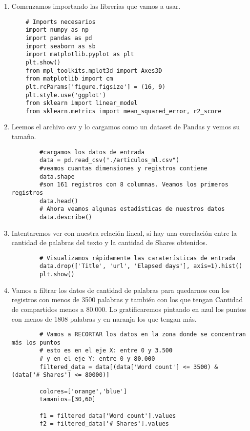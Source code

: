 \documentclass{article}
\begin{document}
\begin{enumerate}
    \item Comenzamos importando las librerías que vamos a usar.
    \begin{verbatim} 
    # Imports necesarios
    import numpy as np
    import pandas as pd
    import seaborn as sb
    import matplotlib.pyplot as plt
    plt.show()
    from mpl_toolkits.mplot3d import Axes3D
    from matplotlib import cm
    plt.rcParams['figure.figsize'] = (16, 9)
    plt.style.use('ggplot')
    from sklearn import linear_model
    from sklearn.metrics import mean_squared_error, r2_score
    \end{verbatim}
    \item Leemos el archivo csv y lo cargamos como un dataset de Pandas y vemos su tamaño.
    \begin{verbatim} 
        #cargamos los datos de entrada
        data = pd.read_csv("./articulos_ml.csv")
        #veamos cuantas dimensiones y registros contiene
        data.shape
        #son 161 registros con 8 columnas. Veamos los primeros registros
        data.head()
        # Ahora veamos algunas estadísticas de nuestros datos
        data.describe()
    \end{verbatim}
    \item Intentaremos ver con nuestra relación lineal, si hay una correlación
        entre la cantidad de palabras del texto y la cantidad de Shares obtenidos.
    \begin{verbatim} 
        # Visualizamos rápidamente las caraterísticas de entrada
        data.drop(['Title', 'url', 'Elapsed days'], axis=1).hist()
        plt.show()
    \end{verbatim}
    \item  Vamos a filtrar los datos de cantidad de palabras para quedarnos con los registros con menos de 3500 palabras y también
    con los que tengan Cantidad de compartidos menos a 80.000. Lo gratificaremos pintando en azul los
    puntos con menos de 1808 palabras y en naranja los que tengan más.
    \begin{verbatim} 
        # Vamos a RECORTAR los datos en la zona donde se concentran más los puntos
        # esto es en el eje X: entre 0 y 3.500
        # y en el eje Y: entre 0 y 80.000
        filtered_data = data[(data['Word count'] <= 3500) & (data['# Shares'] <= 80000)]

        colores=['orange','blue']
        tamanios=[30,60]

        f1 = filtered_data['Word count'].values
        f2 = filtered_data['# Shares'].values


\end{verbatim}
\end{enumerate}
\end{document}
